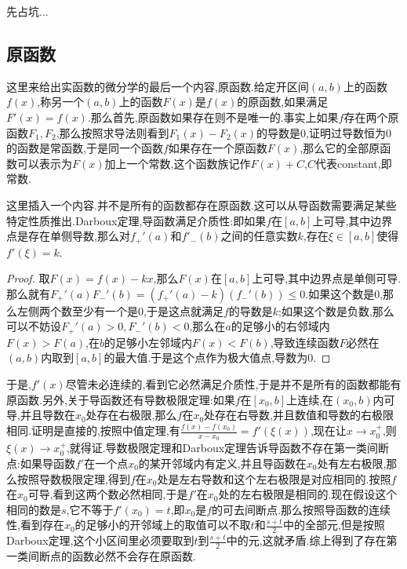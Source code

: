 先占坑...
\newpage
\subsection{原函数}

这里来给出实函数的微分学的最后一个内容,原函数.给定开区间$(a,b)$上的函数$f(x)$,称另一个$(a,b)$上的函数$F(x)$是$f(x)$的原函数,如果满足$F'(x)=f(x)$.那么首先,原函数如果存在则不是唯一的.事实上如果$f$存在两个原函数$F_1,F_2$,那么按照求导法则看到$F_1(x)-F_2(x)$的导数是0,证明过导数恒为0的函数是常函数,于是同一个函数$f$如果存在一个原函数$F(x)$,那么它的全部原函数可以表示为$F(x)$加上一个常数,这个函数族记作$F(x)+C$,$C$代表constant,即常数.

这里插入一个内容.并不是所有的函数都存在原函数.这可以从导函数需要满足某些特定性质推出.Darboux定理,导函数满足介质性:即如果$f$在$[a,b]$上可导,其中边界点是存在单侧导数,那么对$f_+'(a)$和$f'_-(b)$之间的任意实数$k$,存在$\xi\in[a,b]$使得$f'(\xi)=k$.
\begin{proof}
	
	取$F(x)=f(x)-kx$,那么$F(x)$在$[a,b]$上可导,其中边界点是单侧可导.那么就有$F_+'(a)F_-'(b)=(f_+'(a)-k)(f_-'(b))\le0$.如果这个数是0,那么左侧两个数至少有一个是0,于是这点就满足$f$的导数是$k$;如果这个数是负数,那么可以不妨设$F_+'(a)>0,F_-'(b)<0$,那么在$a$的足够小的右邻域内$F(x)>F(a)$,在$b$的足够小左邻域内$F(x)<F(b)$,导致连续函数$F$必然在$(a,b)$内取到$[a,b]$的最大值.于是这个点作为极大值点,导数为0.
	
\end{proof}

于是,$f'(x)$尽管未必连续的,看到它必然满足介质性,于是并不是所有的函数都能有原函数.另外,关于导函数还有导数极限定理:如果$f$在$[x_0,b]$上连续,在$(x_0,b)$内可导,并且导数在$x_0$处存在右极限,那么$f$在$x_0$处存在右导数,并且数值和导数的右极限相同.证明是直接的,按照中值定理,有$\frac{f(x)-f(x_0)}{x-x_0}=f'(\xi(x))$,现在让$x\to x_0^+$,则$\xi(x)\to x_0^+$,就得证.导数极限定理和Darboux定理告诉导函数不存在第一类间断点:如果导函数$f'$在一个点$x_0$的某开邻域内有定义,并且导函数在$x_0$处有左右极限,那么按照导数极限定理,得到$f$在$x_0$处是左右导数和这个左右极限是对应相同的.按照$f$在$x_0$可导,看到这两个数必然相同,于是$f'$在$x_0$处的左右极限是相同的.现在假设这个相同的数是$s$,它不等于$f'(x_0)=t$,即$x_0$是$f$的可去间断点.那么按照导函数的连续性,看到存在$x_0$的足够小的开邻域上的取值可以不取$t$和$\frac{s+t}{2}$中的全部元,但是按照Darboux定理,这个小区间里必须要取到$t$到$\frac{s+t}{2}$中的元,这就矛盾.综上得到了存在第一类间断点的函数必然不会存在原函数.

